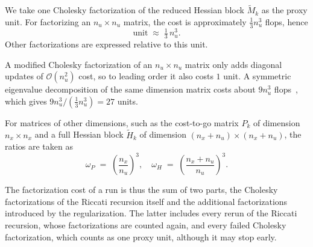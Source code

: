 \documentclass[class=scrbook, crop=false]{standalone}
\begin{document}
We take one Cholesky factorization of the reduced Hessian block $\tilde{M}_k$ as the proxy unit. 
For factorizing an $n_u \times n_u$ matrix, the cost is approximately $\tfrac{1}{3} n_u^3$ flops, hence
\begin{equation}
\mathrm{unit} \;\approx\; \tfrac{1}{3}\, n_u^3.
\end{equation}
Other factorizations are expressed relative to this unit.

A modified Cholesky factorization of an $n_u \times n_u$ matrix
only adds diagonal updates of $\mathcal{O}(n_u^2)$ cost, 
so to leading order it also costs $1$ unit.
A symmetric eigenvalue decomposition of the same dimension matrix costs 
about $9 n_u^3$ flops~\cite{verschuerenTimeoptimalRaceCar2016b},
which gives $9 n_u^3 / (\tfrac{1}{3} n_u^3) = 27$ units.

For matrices of other dimensions, such as
the cost-to-go matrix $P_k$ of dimension $n_x \times n_x$ 
and a full Hessian block $\tilde{H}_k$ of dimension ${(n_x+n_u) \times (n_x+n_u)}$, 
the ratios are taken as
\begin{equation}
\omega_P \;=\; \left(\frac{n_x}{n_u}\right)^{3}, \quad
\omega_H \;=\; \left(\frac{n_x+n_u}{n_u}\right)^{3}.
\end{equation}

The factorization cost of a run is thus the sum of two parts,
the Cholesky factorizations of the Riccati recursion itself and
the additional factorizations introduced by the regularization.
The latter includes every rerun of the Riccati recursion, whose factorizations are counted again,
and every failed Cholesky factorization, which counts as one proxy unit, although it may stop early.
\end{document}
